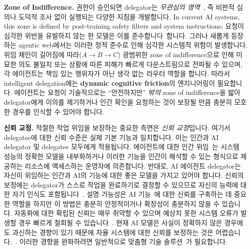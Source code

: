 \documentclass[11pt, a4paper, twocolumn, copyright, goog]{google}
\begin{document}
\textbf{Zone of Indifference.} 권한이 승인되면 delegator는 \emph{무관심의 영역}~\citep{finkelman1993crossing, rosanas2003loyalty, isomura2021management}, 즉 비판적 심의나 도덕적 조사 없이 실행되는 다양한 지침을 개발합니다. In current AI systems, this zone is defined by post-training safety filters and system instructions; 요청이 심각한 위반을 유발하지 않는 한 모델은 이를 준수합니다~\citep{akheel2025guardrails}합니다. 그러나 새롭게 등장하는 agentic web에서는 이러한 정적 준수로 인해 심각한 시스템적 위험이 발생합니다. 위임 체인이 길어짐에 따라($A \rightarrow B \rightarrow C$) 광범위한 zone of indifference으로 인해 미묘한 의도 불일치 또는 상황에 따른 피해가 빠르게 다운스트림으로 전파될 수 있으며, 각 에이전트는 책임 있는 행위자가 아닌 생각 없는 라우터 역할을 합니다. 따라서 intelligent delegation에는 \textbf{dynamic cognitive friction}의 엔지니어링이 필요합니다. 에이전트는 요청이 기술적으로는 ``안전하지만'' \textit{밖의} zone of indifference을 밟아 delegator에게 이의를 제기하거나 인간 확인을 요청하는 것이 보장될 만큼 충분히 모호한 경우를 인식할 수 있어야 합니다.

\textbf{신뢰 교정.} 적절한 작업 위임을 보장하는 중요한 측면은 \emph{신뢰 교정}입니다. 여기서 delegatee에 대한 신뢰 수준은 실제 기본 기능과 일치합니다. 이는 인간과 AI delegator 및 delegatee 모두에게 적용됩니다. 에이전트에 대한 인간 위임~\citep{kohn2021measurement, gebru2022review, wischnewski2023measuring, afroogh2024trust}는 시스템 성능의 정확한 모델을 내부화하거나 이러한 기능을 인간이 해석할 수 있는 형식으로 제공하는 리소스에 액세스하는 운영자에 의존합니다. 반대로, AI 에이전트 delegator는 자신이 위임하는 인간과 AI의 기능에 대한 좋은 모델을 가지고 있어야 합니다. 신뢰의 보정에는 delegator가 스스로 작업을 완료하기로 결정할 수 있으므로 자신의 능력에 대한 자기 인식도 포함됩니다~\citep{ma2023should}. 설명 가능성은 AI 기능~\citep{naiseh2021explainable, naiseh2023different, franklin2022influence, herzog2024boosting}에 대한 신뢰를 구축하는 데 중요한 역할을 하지만 이 방법은 충분히 안정적이거나 확장성이 충분하지 않을 수 있습니다. 자동화에 대한 확립된 신뢰는 매우 취약할 수 있으며 예상치 못한 시스템 오류가 발생할 경우 빠르게 철회될 수 있습니다~\citep{dhuliawala2023diachronicperspectiveusertrust}. 현재 AI 모델은 사실이 정확하지 않은 경우에도 과신하는 경향이 있기 때문에 자율 시스템에 대한 신뢰를 보정하는 것은 어렵습니다.~\citep{jiang2021can, he2023investigatinguncertaintycalibrationaligned, krause2023confidently, geng2023survey, aliferis2024overfitting, li2024overconfident, liu2025uncertainty}. 이러한 경향을 완화하려면 일반적으로 맞춤형 기술 솔루션~\citep{lin2022teaching, xiao2022uncertainty, ren2023robots, kapoor2024calibration}가 필요합니다.
\end{document}
